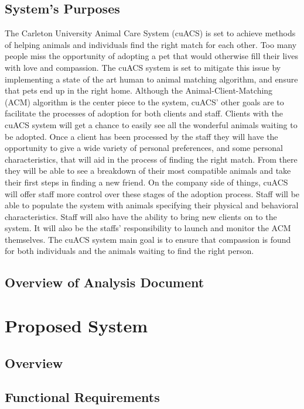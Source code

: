 \documentclass{article}
\begin{document}
\subsection{System's Purposes}
\indent
{\par The Carleton University Animal Care System (cuACS) is set to achieve methods of helping animals and individuals find the right match for each other.  Too many people miss the opportunity of adopting a pet that would otherwise fill their lives with love and compassion.  The cuACS system is set to mitigate this issue by implementing a state of the art human to animal matching algorithm, and ensure that pets end up in the right home.  Although the Animal-Client-Matching (ACM) algorithm is the center piece to the system, cuACS' other goals are to facilitate the processes of adoption for both clients and staff.  Clients with the cuACS system will get a chance to easily see all the wonderful animals waiting to be adopted.  Once a client has been processed by the staff they will have the opportunity to give a wide variety of personal preferences, and some personal characteristics, that will aid in the process of finding the right match.  From there they will be able to see a breakdown of their most compatible animals and take their first steps in finding a new friend.  On the company side of things, cuACS will offer staff more control over these stages of the adoption process.  Staff will be able to populate the system with animals specifying their physical and behavioral characteristics.  Staff will also have the ability to bring new clients on to the system.  It will also be the staffs' responsibility to launch and monitor the ACM themselves.  The cuACS system main goal is to ensure that compassion is found for both individuals and the animals waiting to find the right person.}
\subsection{Overview of Analysis Document}

\section{Proposed System}

\subsection{Overview}

\subsection{Functional Requirements}
\end{document}
